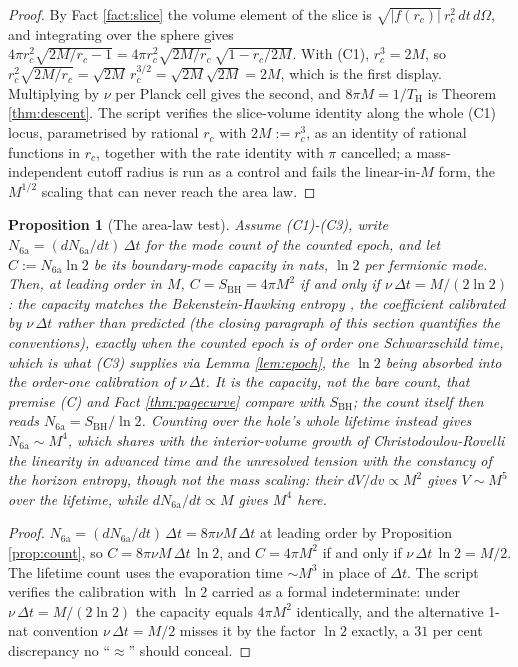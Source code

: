 \documentclass[11pt]{article}
\newtheorem{proposition}[theorem]{Proposition}
\theoremstyle{definition}
\renewcommand{\TH}{T_{\mathrm{H}}} %
\begin{document}
\begin{proof}
By Fact \ref{fact:slice} the volume element of the slice is $\sqrt{|f(r_c)|}\,r_c^{2}\,dt\,d\Omega$, and integrating over the sphere gives $4\pi r_c^{2}\sqrt{2M/r_c - 1} = 4\pi r_c^{2}\sqrt{2M/r_c}\,\sqrt{1 - r_c/2M}$. With (C1), $r_c^{3} = 2M$, so $r_c^{2}\sqrt{2M/r_c} = \sqrt{2M}\,r_c^{3/2} = \sqrt{2M}\sqrt{2M} = 2M$, which is the first display. Multiplying by $\nu$ per Planck cell gives the second, and $8\pi M = 1/\TH$ is Theorem \ref{thm:descent}. The script verifies the slice-volume identity along the whole (C1) locus, parametrised by rational $r_c$ with $2M := r_c^{3}$, as an identity of rational functions in $r_c$, together with the rate identity with $\pi$ cancelled; a mass-independent cutoff radius is run as a control and fails the linear-in-$M$ form, the $M^{1/2}$ scaling that can never reach the area law.
\end{proof}

\begin{proposition}[The area-law test]\label{prop:arealaw}
Assume (C1)-(C3), write $N_{\mathrm{6a}} = (dN_{\mathrm{6a}}/dt)\,\Delta t$ for the mode count of the counted epoch, and let $C := N_{\mathrm{6a}}\ln 2$ be its boundary-mode capacity in nats, $\ln 2$ per fermionic mode. Then, at leading order in $M$, $C = S_{\mathrm{BH}} = 4\pi M^2$ if and only if $\nu\,\Delta t = M/(2\ln 2)$: the capacity matches the Bekenstein-Hawking entropy \cite{Bekenstein1973, Hawking1975}, the coefficient calibrated by $\nu\,\Delta t$ rather than predicted (the closing paragraph of this section quantifies the conventions), exactly when the counted epoch is of order one Schwarzschild time, which is what (C3) supplies via Lemma \ref{lem:epoch}, the $\ln 2$ being absorbed into the order-one calibration of $\nu\,\Delta t$. It is the capacity, not the bare count, that premise (C) and Fact \ref{thm:pagecurve} compare with $S_{\mathrm{BH}}$; the count itself then reads $N_{\mathrm{6a}} = S_{\mathrm{BH}}/\ln 2$. Counting over the hole's whole lifetime instead gives $N_{\mathrm{6a}} \sim M^4$, which shares with the interior-volume growth of Christodoulou-Rovelli \cite{CR2015} the linearity in advanced time and the unresolved tension with the constancy of the horizon entropy, though not the mass scaling: their $dV/dv \propto M^{2}$ gives $V \sim M^{5}$ over the lifetime, while $dN_{\mathrm{6a}}/dt \propto M$ gives $M^{4}$ here.
\end{proposition}

\begin{proof}
$N_{\mathrm{6a}} = (dN_{\mathrm{6a}}/dt)\,\Delta t = 8\pi\nu M\,\Delta t$ at leading order by Proposition \ref{prop:count}, so $C = 8\pi\nu M\,\Delta t\,\ln 2$, and $C = 4\pi M^{2}$ if and only if $\nu\,\Delta t\,\ln 2 = M/2$. The lifetime count uses the evaporation time $\sim M^{3}$ in place of $\Delta t$. The script verifies the calibration with $\ln 2$ carried as a formal indeterminate: under $\nu\,\Delta t = M/(2\ln 2)$ the capacity equals $4\pi M^{2}$ identically, and the alternative 1-nat convention $\nu\,\Delta t = M/2$ misses it by the factor $\ln 2$ exactly, a $31$ per cent discrepancy no ``$\approx$'' should conceal.
\end{proof}
\end{document}
